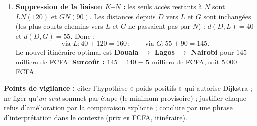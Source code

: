 \documentclass[11pt]{article}
\begin{document}
\begin{corrige}
\begin{enumerate}
\begin{itemize}
    \item \emph{Étape 2} (minimum provisoire : $Y = 25$) : via $Y$ : $L$ vaudrait $25+35 = 60 > 40$ (rejeté) ; $G$ vaudrait $25+70 = 95 > 55$ (rejeté).
    \item \emph{Étape 3} (minimum : $L = 40$) : via $L$ : $K$ vaudrait $40+30 = 70 > 60$ (rejeté) ; $N \leftarrow 40+120 = 160$.
    \item \emph{Étape 4} (minimum : $G = 55$) : via $G$ : $K$ vaudrait $55+45 = 100 > 60$ (rejeté) ; $N \leftarrow 55+90 = 145 < 160$ (amélioré).
    \item \emph{Étape 5} (minimum : $K = 60$) : via $K$ : $N \leftarrow 60+80 = 140 < 145$ (amélioré).
    \item \emph{Étape 6} : $N = 140$ devient définitive.
\end{itemize}
\textbf{b) Prix minimal :} $\mathbf{140}$ milliers de FCFA, soit $140\,000$ FCFA.\\
\textbf{Itinéraire :} on remonte les prédécesseurs : $N \leftarrow K \leftarrow D$, soit \textbf{Douala $\to$ Kinshasa $\to$ Nairobi}.
\item \textbf{Suppression de la liaison $K$--$N$ :} les seuls accès restants à $N$ sont $LN(120)$ et $GN(90)$. Les distances depuis $D$ vers $L$ et $G$ sont inchangées (les plus courts chemins vers $L$ et $G$ ne passaient pas par $N$) : $d(D, L) = 40$ et $d(D, G) = 55$. Donc :
\[ \text{via } L : 40 + 120 = 160 \ ; \qquad \text{via } G : 55 + 90 = 145. \]
Le nouvel itinéraire optimal est \textbf{Douala $\to$ Lagos $\to$ Nairobi} pour $145$ milliers de FCFA. \textbf{Surcoût :} $145 - 140 = \mathbf{5}$ milliers de FCFA, soit $5\,000$ FCFA.
\end{enumerate}
\textbf{Points de vigilance :} citer l'hypothèse « poids positifs » qui autorise Dijkstra ; ne figer qu'\emph{un seul} sommet par étape (le minimum provisoire) ; justifier chaque refus d'amélioration par la comparaison explicite ; conclure par une phrase d'interprétation dans le contexte (prix en FCFA, itinéraire).
\end{corrige}
\end{document}
